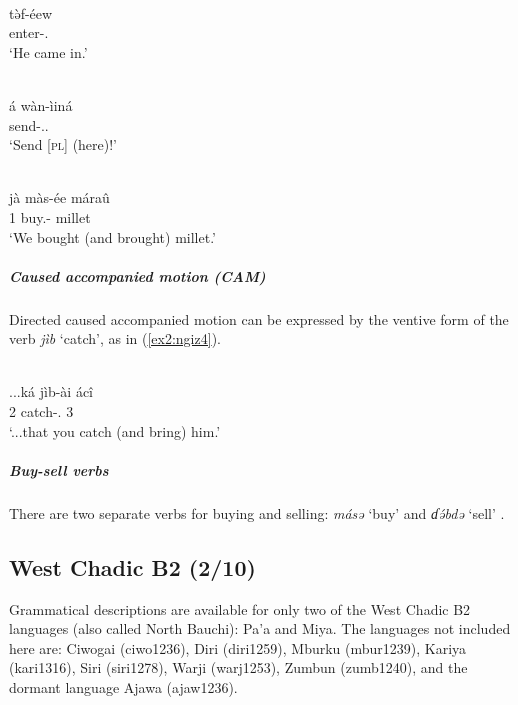 \ea\label{ex2:ngiz1}
 \\
\gll  tə̀f-éew \\
enter-. \\
\glt `He came in.'

\ex\label{ex2:ngiz2}
 \\
\gll  á	wàn-ìiná \\
	send-.. \\
\glt `Send [\textsc{pl}] (here)!'

\ex\label{ex2:ngiz3}
 \\
\gll jà	màs-ée	máraû \\
1	buy.-	millet \\
\glt `We bought (and brought) millet.'
\z 

\subparagraph{Caused accompanied motion (CAM)}



Directed caused accompanied motion can be expressed by the ventive form of the verb \textit{jìb} `catch', as in (\ref{ex2:ngiz4}).

\ea\label{ex2:ngiz4}
 \\
\gll ...ká	jìb-ài	ácî \\
2	catch-.	3 \\
\glt `...that you catch (and bring) him.'
\z 

\subparagraph{Buy-sell verbs}



There are two separate verbs for buying and selling: \textit{másə} `buy' and \textit{ɗə́bdə} `sell' \citep[14]{schuhAspectsNgizimSyntax1972}.

\subsection{West Chadic B2 (2/10)}

Grammatical descriptions are available for only two of the West Chadic B2 languages (also called North Bauchi): Pa'a and Miya. The languages not included here are: Ciwogai (ciwo1236), Diri (diri1259), Mburku (mbur1239), Kariya (kari1316), Siri (siri1278), Warji (warj1253), Zumbun (zumb1240), and the dormant language Ajawa (ajaw1236). 


